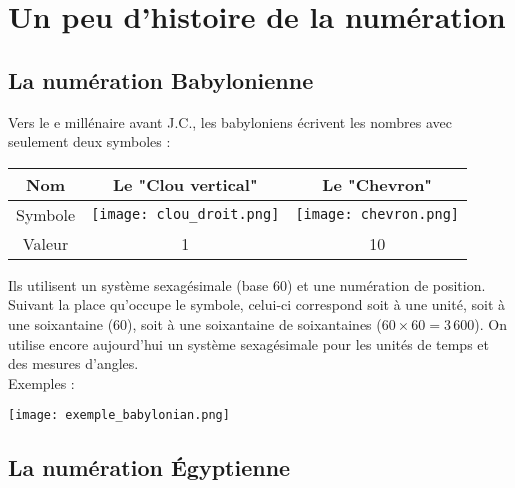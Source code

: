\section{Un peu d'histoire de la numération}

\subsection{La numération Babylonienne}

\begin{His}
Vers le e millénaire avant J.C., les babyloniens écrivent les nombres avec seulement deux symboles :\\
\begin{center}
\begin{tabular}{c|c|c}
Nom & Le "Clou vertical" & Le "Chevron" \\\hline
Symbole & \texttt{[image: clou\_droit.png]} & \texttt{[image: chevron.png]} \\\hline
Valeur & 1 & 10 \\
\end{tabular}
\end{center}

Ils utilisent un système sexagésimale (base $60$) et une numération de position. Suivant la place qu'occupe le symbole, celui-ci correspond soit à une unité, soit à une soixantaine ($60$), soit à une soixantaine de soixantaines ($60\times60=3\,600$). On utilise encore aujourd'hui un système sexagésimale pour les unités de temps et des mesures d'angles.\\

Exemples :
\begin{center}
\texttt{[image: exemple\_babylonian.png]}
\end{center}
\end{His}

\subsection{La numération Égyptienne}

